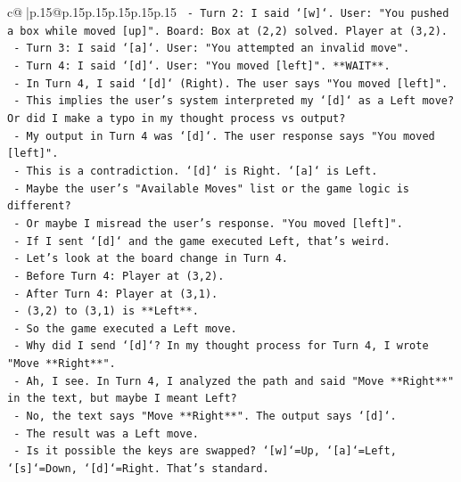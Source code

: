 \documentclass{article}
\begin{document}
{\begin{supertabular}{c@{$\;$}|p{.15\linewidth}@{}p{.15\linewidth}p{.15\linewidth}p{.15\linewidth}p{.15\linewidth}p{.15\linewidth}}
{{{\texttt{        {-} Turn 2: I said `{[}w{]}`. User: "You pushed a box while moved {[}up{]}". Board: Box at (2,2) solved. Player at (3,2).} \\
\texttt{        {-} Turn 3: I said `{[}a{]}`. User: "You attempted an invalid move".} \\
\texttt{        {-} Turn 4: I said `{[}d{]}`. User: "You moved {[}left{]}". **WAIT**.} \\
\texttt{          {-} In Turn 4, I said `{[}d{]}` (Right). The user says "You moved {[}left{]}".} \\
\texttt{          {-} This implies the user's system interpreted my `{[}d{]}` as a Left move? Or did I make a typo in my thought process vs output?} \\
\texttt{          {-} My output in Turn 4 was `{[}d{]}`. The user response says "You moved {[}left{]}".} \\
\texttt{          {-} This is a contradiction. `{[}d{]}` is Right. `{[}a{]}` is Left.} \\
\texttt{          {-} Maybe the user's "Available Moves" list or the game logic is different?} \\
\texttt{          {-} Or maybe I misread the user's response. "You moved {[}left{]}".} \\
\texttt{          {-} If I sent `{[}d{]}` and the game executed Left, that's weird.} \\
\texttt{          {-} Let's look at the board change in Turn 4.} \\
\texttt{            {-} Before Turn 4: Player at (3,2).} \\
\texttt{            {-} After Turn 4: Player at (3,1).} \\
\texttt{            {-} (3,2) to (3,1) is **Left**.} \\
\texttt{            {-} So the game executed a Left move.} \\
\texttt{            {-} Why did I send `{[}d{]}`? In my thought process for Turn 4, I wrote "Move **Right**".} \\
\texttt{            {-} Ah, I see. In Turn 4, I analyzed the path and said "Move **Right**" in the text, but maybe I meant Left?} \\
\texttt{            {-} No, the text says "Move **Right**". The output says `{[}d{]}`.} \\
\texttt{            {-} The result was a Left move.} \\
\texttt{            {-} Is it possible the keys are swapped? `{[}w{]}`=Up, `{[}a{]}`=Left, `{[}s{]}`=Down, `{[}d{]}`=Right. That's standard.} \\
}}}
\end{supertabular}}
\end{document}
